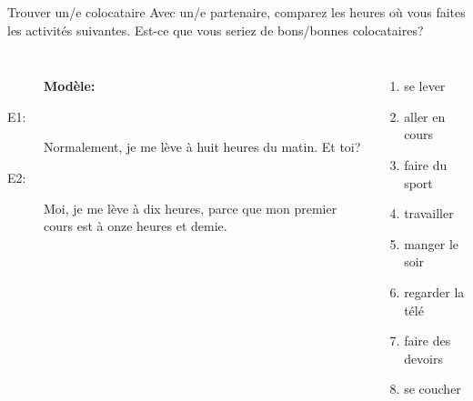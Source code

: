 \begin{frame}{Trouver un/e colocataire}
  Avec un/e partenaire, comparez les heures où vous faites les activités suivantes.
  Est-ce que vous seriez de bons/bonnes colocataires? \\
  \begin{columns}
      \begin{description}
        \item[] \textbf{Modèle:}
        \item[] 
        \item[E1:] Normalement, je me lève à huit heures du matin. Et toi?
        \item[] 
        \item[E2:] Moi, je me lève à dix heures, parce que mon premier cours est à onze heures et demie.
        \item[] 
      \end{description}
      \small
      \begin{enumerate}
        \item se lever
        \item aller en cours
        \item faire du sport
        \item travailler
        \item manger le soir
        \item regarder la télé
        \item faire des devoirs
        \item se coucher
      \end{enumerate}
  \end{columns}
\end{frame}